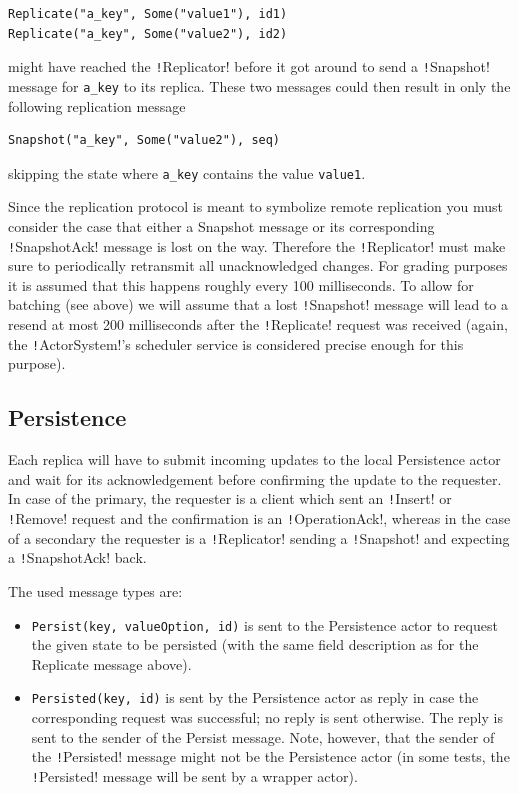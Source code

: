 \documentclass{article}
\begin{document}
\begin{verbatim}
Replicate("a_key", Some("value1"), id1) 
Replicate("a_key", Some("value2"), id2) 
\end{verbatim}
might have reached the \texttt!Replicator! before it got around to send a \texttt!Snapshot! message for \texttt{a_key} to its replica. These two messages could then result in only the following replication message

\begin{verbatim}
Snapshot("a_key", Some("value2"), seq) 
\end{verbatim}

skipping the state where \texttt{a_key} contains the value \texttt{value1}.

Since the replication protocol is meant to symbolize remote replication you must consider the case that either a Snapshot message or its corresponding \texttt!SnapshotAck! message is lost on the way. Therefore the \texttt!Replicator!  must make sure to periodically retransmit all unacknowledged changes.  For grading purposes it is assumed that this happens roughly every 100  milliseconds. To allow for batching (see above) we will assume that a  lost \texttt!Snapshot! message will lead to a resend at most 200 milliseconds after the \texttt!Replicate! request was received (again, the \texttt!ActorSystem!’s scheduler service is considered precise enough for this purpose).

\subsection{Persistence}\label{ss:persistence}

Each replica will have to submit incoming updates to the local Persistence actor and wait for its acknowledgement before confirming the update to the requester. In case of the primary, the requester is a client which sent an \texttt!Insert! or \texttt!Remove! request and the confirmation is an \texttt!OperationAck!, whereas in the case of a secondary the requester is a \texttt!Replicator! sending a \texttt!Snapshot! and expecting a \texttt!SnapshotAck! back.

The used message types are:

\begin{itemize}
    \item \texttt{Persist(key, valueOption, id)} is sent to the Persistence actor to request the given state to be persisted (with the same field description as for the Replicate message above).
    \item \texttt{Persisted(key, id)} is sent by the Persistence actor as reply in case the corresponding request was successful; no reply is sent otherwise. The reply is sent to the sender of the Persist message. Note, however, that the sender of the \texttt!Persisted! message might not be the Persistence actor (in some tests, the \texttt!Persisted! message will be sent by a wrapper actor).
\end{itemize}
\end{document}
